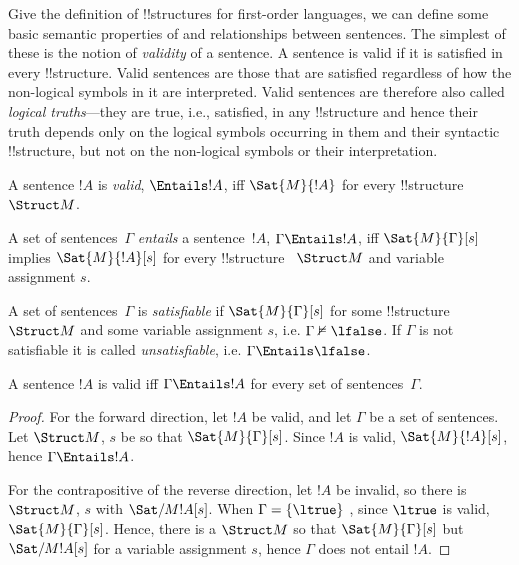 \documentclass[../../../include/open-logic-section]{subfiles}
\begin{document}

\begin{explain}
Give the definition of !!{structure}s for first-order languages, we can
define some basic semantic properties of and relationships between
sentences.  The simplest of these is the notion of \emph{validity} of
a sentence.  A sentence is valid if it is satisfied in every
!!{structure}.  Valid sentences are those that are satisfied regardless of
how the non-logical symbols in it are interpreted.  Valid sentences
are therefore also called \emph{logical truths}---they are true, i.e.,
satisfied, in any !!{structure} and hence their truth depends only on the
logical symbols occurring in them and their syntactic !!{structure}, but not
on the non-logical symbols or their interpretation.
\end{explain}

\begin{defn}[Validity]
A sentence $!A$ is \emph{valid}, $\Entails !A$, iff $\Sat{M}{!A}$ for every
!!{structure}~$\Struct M$.
\end{defn}

\begin{defn}[Entailment]
A set of sentences~$\Gamma$ \emph{entails} a sentence~$!A$, $\Gamma \Entails 
!A$, iff $\Sat {M}{\Gamma}[s]$ implies $\Sat{M}{!A}[s]$ for every !!{structure}
~$\Struct M$ and variable assignment $s$.
\end{defn}


\begin{defn}[Satisfiability]
A set of sentences~$\Gamma$ is \emph{satisfiable} if $\Sat{M}{\Gamma}[s]$ for 
some !!{structure}~$\Struct M$ and some variable assignment $s$, i.e. $\Gamma 
\nvDash \lfalse$.  If $\Gamma$ is not satisfiable it is called \emph{ 
unsatisfiable}, i.e. $\Gamma \Entails \lfalse$.
\end{defn}

\begin{prop}
A sentence $!A$ is valid iff $\Gamma \Entails !A$ for every set of
sentences~$\Gamma$.
\end{prop}

\begin{proof}
For the forward direction, let $!A$ be valid, and let $\Gamma$ be a set of 
sentences. Let $\Struct M$, $s$ be so that $\Sat{M}{\Gamma}[s]$. Since $!A$ 
is valid, $\Sat{M}{!A}[s]$, hence $\Gamma \Entails !A$.

For the contrapositive of the reverse direction, let $!A$ be invalid, so 
there is $\Struct M$, $s$ with $\Sat/{M}{!A}[s]$. When $\Gamma = \{ \ltrue \}$
  , since $\ltrue$ is valid, $\Sat{M}{\Gamma}[s]$. Hence, there is a $\Struct 
M $ so that $\Sat{M}{\Gamma}[s]$ but $\Sat/{M}{!A}[s]$ for a variable 
assignment $s$, hence $\Gamma$ does not entail $!A$.
\end{proof}
\end{document}
